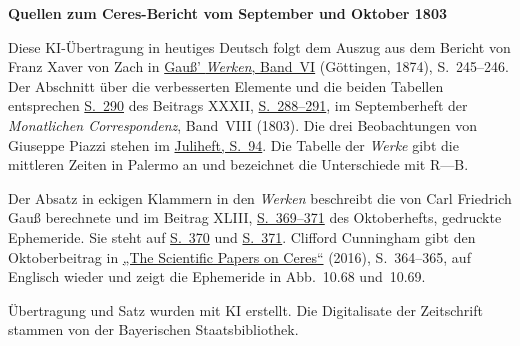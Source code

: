 \clearpage\thispagestyle{empty}
\begin{center}\textbf{Quellen zum Ceres-Bericht vom September und Oktober 1803}\end{center}
\noindent Diese KI-Übertragung in heutiges Deutsch folgt dem Auszug aus dem Bericht von Franz Xaver von Zach in \href{https://gdz.sub.uni-goettingen.de/id/PPN236007467}{Gauß’ \textit{Werken}, Band~VI} (Göttingen, 1874), S.~245--246. Der Abschnitt über die verbesserten Elemente und die beiden Tabellen entsprechen \href{https://api.digitale-sammlungen.de/iiif/image/v2/bsb10538600_00298/full/1450,/0/default.jpg}{S.~290} des Beitrags XXXII, \href{https://api.digitale-sammlungen.de/iiif/image/v2/bsb10538600_00296/full/1450,/0/default.jpg}{S.~288--291}, im Septemberheft der \textit{Monatlichen Correspondenz}, Band~VIII (1803). Die drei Beobachtungen von Giuseppe Piazzi stehen im \href{https://api.digitale-sammlungen.de/iiif/image/v2/bsb10538600_00100/full/1450,/0/default.jpg}{Juliheft, S.~94}. Die Tabelle der \textit{Werke} gibt die mittleren Zeiten in Palermo an und bezeichnet die Unterschiede mit R—B.
\par\smallskip\noindent Der Absatz in eckigen Klammern in den \textit{Werken} beschreibt die von Carl Friedrich Gauß berechnete und im Beitrag XLIII, \href{https://api.digitale-sammlungen.de/iiif/image/v2/bsb10538600_00379/full/1450,/0/default.jpg}{S.~369--371} des Oktoberhefts, gedruckte Ephemeride. Sie steht auf \href{https://api.digitale-sammlungen.de/iiif/image/v2/bsb10538600_00380/full/1450,/0/default.jpg}{S.~370} und \href{https://api.digitale-sammlungen.de/iiif/image/v2/bsb10538600_00381/full/1450,/0/default.jpg}{S.~371}. Clifford Cunningham gibt den Oktoberbeitrag in \href{https://doi.org/10.1007/978-3-319-28815-4_10}{„The Scientific Papers on Ceres“} (2016), S.~364--365, auf Englisch wieder und zeigt die Ephemeride in Abb.~10.68 und~10.69.
\par\smallskip\noindent Übertragung und Satz wurden mit KI erstellt. Die Digitalisate der Zeitschrift stammen von der Bayerischen Staatsbibliothek.
\clearpage
